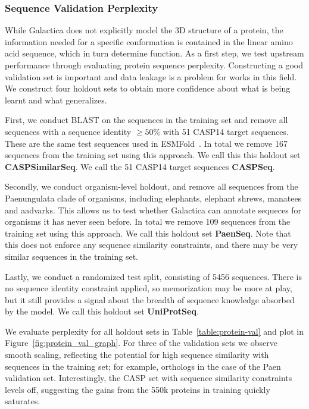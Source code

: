 {\subsubsection{Sequence Validation Perplexity}

While Galactica does not explicitly model the 3D structure of a protein, the information needed for a specific conformation is contained in the linear amino acid sequence, which in turn determine function. As a first step, we test upstream performance through evaluating protein sequence perplexity. Constructing a good validation set is important and data leakage is a problem for works in this field. We construct four holdout sets to obtain more confidence about what is being learnt and what generalizes.

First, we conduct BLAST on the sequences in the training set and remove all sequences with a sequence identity \(\geq 50\%\) with 51 CASP14 target sequences. These are the same test sequences used in ESMFold~\citep{ESMFold}. In total we remove 167 sequences from the training set using this approach. We call this this holdout set \textbf{CASPSimilarSeq}. We call the 51 CASP14 target sequences \textbf{CASPSeq}.

Secondly, we conduct organism-level holdout, and remove all sequences from the Paenungulata clade of organisms, including elephants, elephant shrews, manatees and aadvarks. This allows us to test whether Galactica can annotate sequeces for organisms it has never seen before. In total we remove 109 sequences from the training set using this approach. We call this holdout set \textbf{PaenSeq}. Note that this does not enforce any sequence similarity constraints, and there may be very similar sequences in the training set.

Lastly, we conduct a randomized test split, consisting of 5456 sequences. There is no sequence identity constraint applied, so memorization may be more at play, but it still provides a signal about the breadth of sequence knowledge absorbed by the model. We call this holdout set \textbf{UniProtSeq}.

We evaluate perplexity for all holdout sets in Table~\ref{table:protein-val} and plot in Figure~\ref{fig:protein_val_graph}. For three of the validation sets we observe smooth scaling, reflecting the potential for high sequence similarity with sequences in the training set; for example, orthologs in the case of the Paen validation set. Interestingly, the CASP set with sequence similarity constraints levels off, suggesting the gains from the 550k proteins in training quickly saturates. 

}
